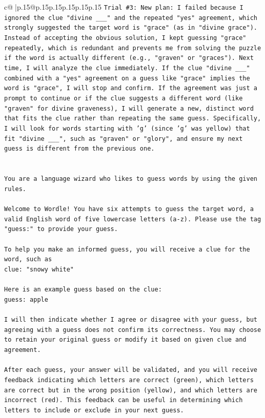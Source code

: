 \documentclass{article}
\begin{document}
{\begin{supertabular}{c@{$\;$}|p{.15\linewidth}@{}p{.15\linewidth}p{.15\linewidth}p{.15\linewidth}p{.15\linewidth}p{.15\linewidth}}
{{{\texttt{Trial \#3: New plan: I failed because I ignored the clue "divine \_\_\_" and the repeated "yes" agreement, which strongly suggested the target word is "grace" (as in "divine grace"). Instead of accepting the obvious solution, I kept guessing "grace" repeatedly, which is redundant and prevents me from solving the puzzle if the word is actually different (e.g., "graven" or "graces"). Next time, I will analyze the clue immediately. If the clue "divine \_\_\_" combined with a "yes" agreement on a guess like "grace" implies the word is "grace", I will stop and confirm. If the agreement was just a prompt to continue or if the clue suggests a different word (like "graven" for divine graveness), I will generate a new, distinct word that fits the clue rather than repeating the same guess. Specifically, I will look for words starting with 'g' (since 'g' was yellow) that fit "divine \_\_\_", such as "graven" or "glory", and ensure my next guess is different from the previous one.} \\
\\ 
\\ 
\texttt{You are a language wizard who likes to guess words by using the given rules.} \\
\\ 
\texttt{Welcome to Wordle! You have six attempts to guess the target word, a valid English word of five lowercase letters (a{-}z). Please use the tag "guess:" to provide your guess.} \\
\\ 
\texttt{To help you make an informed guess, you will receive a clue for the word, such as} \\
\texttt{clue: "snowy white"} \\
\\ 
\texttt{Here is an example guess based on the clue: } \\
\texttt{guess: apple} \\
\\ 
\texttt{I will then indicate whether I agree or disagree with your guess, but agreeing with a guess does not confirm its correctness. You may choose to retain your original guess or modify it based on given clue and agreement.} \\
\\ 
\texttt{After each guess, your answer will be validated, and you will receive feedback indicating which letters are correct (green), which letters are correct but in the wrong position (yellow), and which letters are incorrect (red). This feedback can be useful in determining which letters to include or exclude in your next guess.} \\
}}}
\end{supertabular}}
\end{document}
